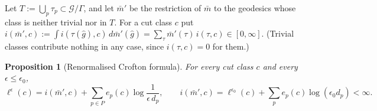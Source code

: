 \documentclass[aps,prd,onecolumn,superscriptaddress,nofootinbib,amsmath,amssymb,11pt]{revtex4-2}
\newtheorem{proposition}[theorem]{Proposition}
\theoremstyle{definition}
\newcommand{\eps}{\epsilon}
\newcommand{\Gq}{\mathcal{G}/\Gamma}
\newcommand{\mbar}{\bar m}
\begin{document}
Let $T:=\bigcup_p\tau_p\subset\Gq$, and let $\mbar'$ be the restriction of $\mbar$ to the geodesics whose class is
neither trivial nor in $T$. For a cut class $c$ put
$i(\mbar',c):=\int i(\tau(\hat g),c)\,d\mbar'(\hat g)=\sum_\tau\mbar'(\tau)\,i(\tau,c)\in[0,\infty]$. (Trivial classes
contribute nothing in any case, since $i(\tau,c)=0$ for them.)

\begin{proposition}[Renormalised Crofton formula]\label{prop:crofton}
For every cut class $c$ and every $\eps\le\eps_0$,
\begin{equation}\label{eq:R}
\ell^\eps(c)=i(\mbar',c)+\sum_{p\in P}e_p(c)\log\frac{1}{\eps\,d_p},
\qquad i(\mbar',c)=\ell^{\eps_0}(c)+\sum_pe_p(c)\log(\eps_0d_p)<\infty.
\end{equation}
\end{proposition}
\end{document}
